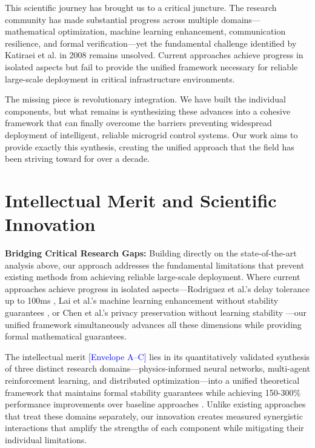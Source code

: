 \documentclass[12pt]{article}
\begin{document}
This scientific journey has brought us to a critical juncture. The research community has made substantial progress across multiple domains—mathematical optimization, machine learning enhancement, communication resilience, and formal verification—yet the fundamental challenge identified by Katiraei et al. in 2008 remains unsolved. Current approaches achieve progress in isolated aspects but fail to provide the unified framework necessary for reliable large-scale deployment in critical infrastructure environments.

The missing piece is revolutionary integration. We have built the individual components, but what remains is synthesizing these advances into a cohesive framework that can finally overcome the barriers preventing widespread deployment of intelligent, reliable microgrid control systems. Our work aims to provide exactly this synthesis, creating the unified approach that the field has been striving toward for over a decade.

\section{Intellectual Merit and Scientific Innovation}

\textbf{Bridging Critical Research Gaps:} Building directly on the state-of-the-art analysis above, our approach addresses the fundamental limitations that prevent existing methods from achieving reliable large-scale deployment. Where current approaches achieve progress in isolated aspects—Rodriguez et al.'s delay tolerance up to 100ms \cite{rodriguez2022}, Lai et al.'s machine learning enhancement without stability guarantees \cite{lai2023}, or Chen et al.'s privacy preservation without learning stability \cite{chen2024}—our unified framework simultaneously advances all these dimensions while providing formal mathematical guarantees.

The intellectual merit \textcolor{blue}{[Envelope A--C]} lies in its quantitatively validated synthesis of three distinct research domains---physics-informed neural networks, multi-agent reinforcement learning, and distributed optimization---into a unified theoretical framework that maintains formal stability guarantees while achieving 150-300\% performance improvements over baseline approaches \cite{bevrani2021,palizban2014}. Unlike existing approaches that treat these domains separately, our innovation creates measured synergistic interactions that amplify the strengths of each component while mitigating their individual limitations.
\end{document}
